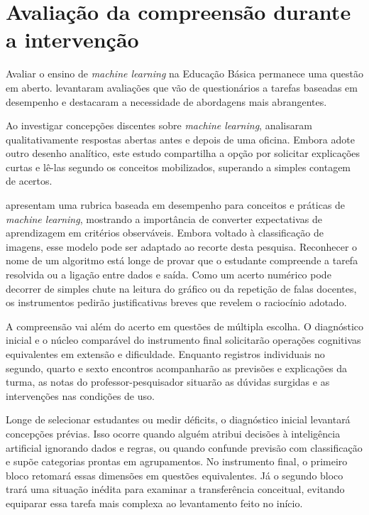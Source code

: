 \section{Avaliação da compreensão durante a intervenção}

Avaliar o ensino de \textit{machine learning} na Educação Básica permanece uma questão em aberto.  levantaram avaliações que vão de questionários a tarefas baseadas em desempenho e destacaram a necessidade de abordagens mais abrangentes.

Ao investigar concepções discentes sobre \textit{machine learning},  analisaram qualitativamente respostas abertas antes e depois de uma oficina. Embora adote outro desenho analítico, este estudo compartilha a opção por solicitar explicações curtas e lê-las segundo os conceitos mobilizados, superando a simples contagem de acertos.

 apresentam uma rubrica baseada em desempenho para conceitos e práticas de \textit{machine learning}, mostrando a importância de converter expectativas de aprendizagem em critérios observáveis. Embora voltado à classificação de imagens, esse modelo pode ser adaptado ao recorte desta pesquisa. Reconhecer o nome de um algoritmo está longe de provar que o estudante compreende a tarefa resolvida ou a ligação entre dados e saída. Como um acerto numérico pode decorrer de simples chute na leitura do gráfico ou da repetição de falas docentes, os instrumentos pedirão justificativas breves que revelem o raciocínio adotado.

A compreensão vai além do acerto em questões de múltipla escolha. O diagnóstico inicial e o núcleo comparável do instrumento final solicitarão operações cognitivas equivalentes em extensão e dificuldade. Enquanto registros individuais no segundo, quarto e sexto encontros acompanharão as previsões e explicações da turma, as notas do professor-pesquisador situarão as dúvidas surgidas e as intervenções nas condições de uso.

Longe de selecionar estudantes ou medir déficits, o diagnóstico inicial levantará concepções prévias. Isso ocorre quando alguém atribui decisões à inteligência artificial ignorando dados e regras, ou quando confunde previsão com classificação e supõe categorias prontas em agrupamentos. No instrumento final, o primeiro bloco retomará essas dimensões em questões equivalentes. Já o segundo bloco trará uma situação inédita para examinar a transferência conceitual, evitando equiparar essa tarefa mais complexa ao levantamento feito no início.

